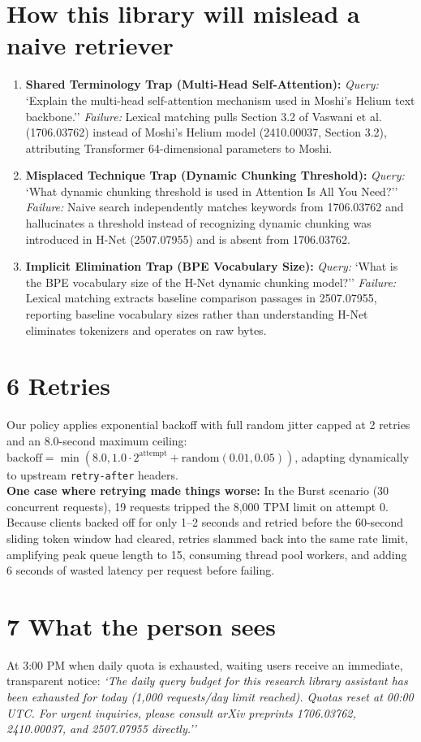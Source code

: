\documentclass[8.5pt,a4paper]{article}
\begin{document}
\section*{How this library will mislead a naive retriever}
\begin{enumerate}
    \item \textbf{Shared Terminology Trap (Multi-Head Self-Attention):} \textit{Query:} `Explain the multi-head self-attention mechanism used in Moshi's Helium text backbone.'' \textit{Failure:} Lexical matching pulls Section 3.2 of Vaswani et al. (1706.03762) instead of Moshi's Helium model (2410.00037, Section 3.2), attributing Transformer 64-dimensional parameters to Moshi.
    \item \textbf{Misplaced Technique Trap (Dynamic Chunking Threshold):} \textit{Query:} `What dynamic chunking threshold is used in Attention Is All You Need?'' \textit{Failure:} Naive search independently matches keywords from 1706.03762 and hallucinates a threshold instead of recognizing dynamic chunking was introduced in H-Net (2507.07955) and is absent from 1706.03762.
    \item \textbf{Implicit Elimination Trap (BPE Vocabulary Size):} \textit{Query:} `What is the BPE vocabulary size of the H-Net dynamic chunking model?'' \textit{Failure:} Lexical matching extracts baseline comparison passages in 2507.07955, reporting baseline vocabulary sizes rather than understanding H-Net eliminates tokenizers and operates on raw bytes.
\end{enumerate}

\section*{6 Retries}
Our policy applies exponential backoff with full random jitter capped at 2 retries and an 8.0-second maximum ceiling: $\text{backoff}=\min(8.0,1.0\cdot 2^{\text{attempt}}+\text{random}(0.01,0.05))$, adapting dynamically to upstream \texttt{retry-after} headers.\\
\textbf{One case where retrying made things worse:} In the Burst scenario (30 concurrent requests), 19 requests tripped the 8,000 TPM limit on attempt 0. Because clients backed off for only 1--2 seconds and retried before the 60-second sliding token window had cleared, retries slammed back into the same rate limit, amplifying peak queue length to 15, consuming thread pool workers, and adding 6 seconds of wasted latency per request before failing.

\section*{7 What the person sees}
At 3:00 PM when daily quota is exhausted, waiting users receive an immediate, transparent notice:
\textit{`The daily query budget for this research library assistant has been exhausted for today (1,000 requests/day limit reached). Quotas reset at 00:00 UTC. For urgent inquiries, please consult arXiv preprints 1706.03762, 2410.00037, and 2507.07955 directly.''}
\end{document}
